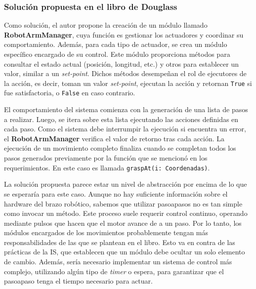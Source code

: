 \subsubsection*{Solución propuesta en el libro de Douglass}

Como solución, el autor propone la creación de un módulo llamado \textbf{RobotArmManager}, cuya función es gestionar los actuadores y coordinar su comportamiento. Además, para cada tipo de actuador, se crea un módulo específico encargado de su control. Este módulo proporciona métodos para consultar el estado actual (posición, longitud, etc.) y otros para establecer un valor, similar a un \textit{set-point}. Dichos métodos desempeñan el rol de ejecutores de la acción, es decir, toman un valor \textit{set-point}, ejecutan la acción y retornan \verb|True| si fue satisfactoria, o \verb|False| en caso contrario.

El comportamiento del sistema comienza con la generación de una lista de pasos a realizar. Luego, se itera sobre esta lista ejecutando las acciones definidas en cada paso. Como el sistema debe interrumpir la ejecución si encuentra un error, el \textbf{RobotArmManager} verifica el valor de retorno tras cada acción. La ejecución de un movimiento completo finaliza cuando se completan todos los pasos generados previamente por la función que se mencionó en los requerimientos. En este caso es llamada \verb|graspAt(i: Coordenadas)|.

La solución propuesta parece estar un nivel de abstracción por encima de lo que se esperaría para este caso. Aunque no hay suficiente información sobre el hardware del brazo robótico, sabemos que utilizar \glspl{pasoapaso} no es tan simple como invocar un método. Este proceso suele requerir control continuo, operando mediante pulsos que hacen que el motor avance de a un paso. Por lo tanto, los módulos encargados de los movimientos probablemente tengan más responsabilidades de las que se plantean en el libro. Esto va en contra de las prácticas de la \gls{IS}, que establecen que un módulo debe ocultar un solo elemento de cambio. Además, sería necesario implementar un sistema de control más complejo, utilizando algún tipo de \textit{timer} o espera, para garantizar que el \gls{pasoapaso} tenga el tiempo necesario para actuar.

